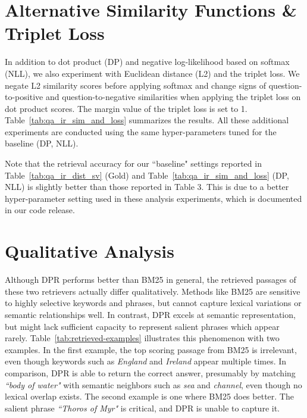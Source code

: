 \documentclass[11pt,a4paper]{article}
\def\model/{DPR}
\begin{document}
\section{Alternative Similarity Functions \& Triplet Loss}
\label{sec:alt-sim}
\label{sec:triplet}

In addition to dot product (DP) and negative log-likelihood based on softmax (NLL), we also experiment with Euclidean distance (L2) and the triplet loss.
We negate L2 similarity scores before applying softmax and change signs of question-to-positive and question-to-negative similarities when applying the triplet loss on dot product scores. 
The margin value of the triplet loss is set to 1.
Table~\ref{tab:qa_ir_sim_and_loss} summarizes the results.
All these additional experiments are conducted using the same hyper-parameters tuned for the baseline (DP, NLL).


Note that the retrieval accuracy for our ``baseline" settings reported in Table~\ref{tab:qa_ir_dist_sv} (Gold) and Table~\ref{tab:qa_ir_sim_and_loss} (DP, NLL) is slightly better than those reported in Table 3.
This is due to a better hyper-parameter setting used in these analysis experiments, which is documented in our code release.


\section{Qualitative Analysis}
\label{sec:qual_ana}



Although \model/ performs better than BM25 in general, the retrieved passages of these two retrievers actually differ qualitatively. Methods like BM25 are sensitive to highly selective keywords and phrases, but cannot capture lexical variations or semantic relationships well.  In contrast, \model/ excels at semantic representation, but might lack sufficient capacity to represent salient phrases which appear rarely.  Table~\ref{tab:retrieved-examples} illustrates this phenomenon with two examples.  In the first example, the top scoring passage from BM25 is irrelevant, even though keywords such as \textit{England} and \textit{Ireland} appear multiple times.  In comparison, \model/ is able to return the correct answer, presumably by matching \textit{``body of water"} with semantic neighbors such as \textit{sea} and \textit{channel}, even though no lexical overlap exists.
The second example is one where BM25 does better.  The salient phrase \textit{``Thoros of Myr"} is critical, and \model/ is unable to capture it.
\end{document}
